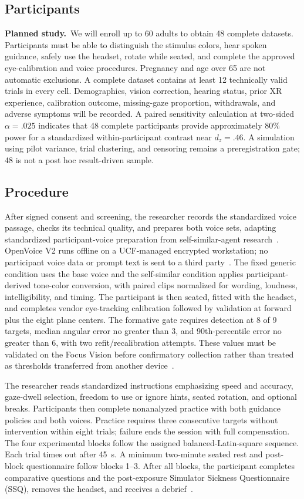 \documentclass[10pt,journal,compsoc]{IEEEtran}
\newcommand{\planned}{\textbf{Planned study.}\ }
\begin{document}
\subsection{Participants}
\planned We will enroll up to 60 adults to obtain 48 complete datasets. Participants must be able to distinguish the stimulus colors, hear spoken guidance, safely use the headset, rotate while seated, and complete the approved eye-calibration and voice procedures. Pregnancy and age over 65 are not automatic exclusions. A complete dataset contains at least 12 technically valid trials in every cell. Demographics, vision correction, hearing status, prior XR experience, calibration outcome, missing-gaze proportion, withdrawals, and adverse symptoms will be recorded. A paired sensitivity calculation at two-sided $\alpha=.025$ indicates that 48 complete participants provide approximately 80\% power for a standardized within-participant contrast near $d_z=.46$. A simulation using pilot variance, trial clustering, and censoring remains a preregistration gate; 48 is not a post hoc result-driven sample.

\subsection{Procedure}
After signed consent and screening, the researcher records the standardized voice passage, checks its technical quality, and prepares both voice sets, adapting standardized participant-voice preparation from self-similar-agent research~\cite{guo2024doppelganger}. OpenVoice V2 runs offline on a UCF-managed encrypted workstation; no participant voice data or prompt text is sent to a third party~\cite{qin2023openvoice}. The fixed generic condition uses the base voice and the self-similar condition applies participant-derived tone-color conversion, with paired clips normalized for wording, loudness, intelligibility, and timing. The participant is then seated, fitted with the headset, and completes vendor eye-tracking calibration followed by validation at forward plus the eight plane centers. The formative gate requires detection at 8 of 9 targets, median angular error no greater than 3\textdegree{}, and 90th-percentile error no greater than 6\textdegree{}, with two refit/recalibration attempts. These values must be validated on the Focus Vision before confirmatory collection rather than treated as thresholds transferred from another device~\cite{chiossi2024searching}.

The researcher reads standardized instructions emphasizing speed and accuracy, gaze-dwell selection, freedom to use or ignore hints, seated rotation, and optional breaks. Participants then complete nonanalyzed practice with both guidance policies and both voices. Practice requires three consecutive targets without intervention within eight trials; failure ends the session with full compensation. The four experimental blocks follow the assigned balanced-Latin-square sequence. Each trial times out after 45~s. A minimum two-minute seated rest and post-block questionnaire follow blocks 1--3. After all blocks, the participant completes comparative questions and the post-exposure Simulator Sickness Questionnaire (SSQ), removes the headset, and receives a debrief~\cite{kennedy1993ssq}.
\end{document}
